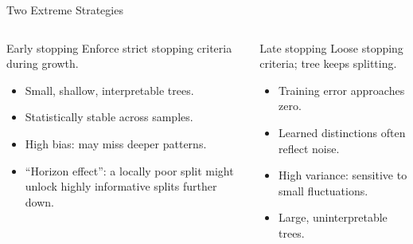 \begin{frame}{Two Extreme Strategies}
  \begin{columns}[t]
      \begin{block}{Early stopping}
        Enforce strict stopping criteria during growth.
        \begin{itemize}
          \item Small, shallow, interpretable trees.
          \item Statistically stable across samples.
          \item \alert{High bias}: may miss deeper patterns.
          \item ``Horizon effect'': a locally poor split might unlock highly informative
                splits further down.
        \end{itemize}
      \end{block}
      \begin{alertblock}{Late stopping}
        Loose stopping criteria; tree keeps splitting.
        \begin{itemize}
          \item Training error approaches zero.
          \item Learned distinctions often reflect \alert{noise}.
          \item High variance: sensitive to small fluctuations.
          \item Large, uninterpretable trees.
        \end{itemize}
      \end{alertblock}
  \end{columns}
\end{frame}

